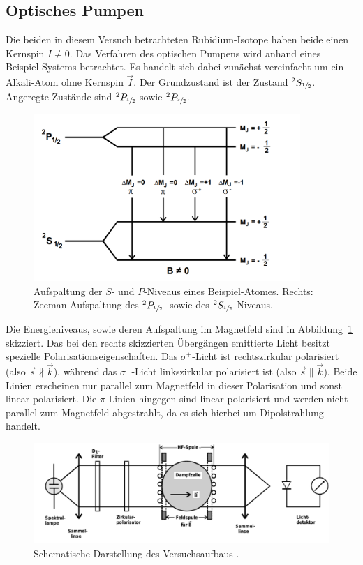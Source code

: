 \documentclass[
  bibliography=totoc,     %
  captions=tableheading,  %
  titlepage=firstiscover, %
]{scrartcl}
\begin{document}
\subsection{Optisches Pumpen}
%
Die beiden in diesem Versuch betrachteten Rubidium-Isotope haben beide einen
Kernspin $I \neq 0$. Das Verfahren des optischen Pumpens wird anhand eines Beispiel-Systems
betrachtet. Es handelt sich dabei zunächst vereinfacht um ein Alkali-Atom ohne Kernspin $\vec{I}$.
Der Grundzustand ist der Zustand $^2S_{\sfrac{1}{2}}$. Angeregte Zustände sind
$^2P_{\sfrac{1}{2}}$ sowie $^2P_{\sfrac{3}{2}}$.
%
\begin{figure}[htb]
  \centering
  \includegraphics[width=0.9\textwidth]{Beispiel.jpg}
  \caption{Aufspaltung der $S$- und $P$-Niveaus eines Beispiel-Atomes. Rechts:
  Zeeman-Aufspaltung des $^2P_{\sfrac{1}{2}}$- sowie des
  $^2S_{\sfrac{1}{2}}$-Niveaus. \cite{anleitung}}
  \label{fig:beispiel}
\end{figure}
\noindent
Die Energieniveaus, sowie deren Aufspaltung im Magnetfeld sind in
Abbildung~\ref{fig:beispiel} skizziert. Das bei den rechts skizzierten
Übergängen emittierte Licht besitzt spezielle Polarisationseigenschaften. Das
$\sigma^+$-Licht ist rechtszirkular polarisiert (also
$\vec{s}\nparallel\vec{k}$), während das $\sigma^-$-Licht linkszirkular
polarisiert ist (also $\vec{s}\parallel\vec{k}$). Beide Linien erscheinen nur
parallel zum Magnetfeld in dieser Polarisation und sonst linear polarisiert.
Die $\pi$-Linien hingegen sind linear polarisiert und werden nicht parallel zum
Magnetfeld abgestrahlt, da es sich hierbei um Dipolstrahlung handelt.
%
\begin{figure}[htb]
  \centering
  \includegraphics[width=\textwidth]{Versuchsaufbau.pdf}
  \caption{Schematische Darstellung des Versuchsaufbaus \cite{anleitung}.}
  \label{fig:aufbau}
\end{figure}
\end{document}
